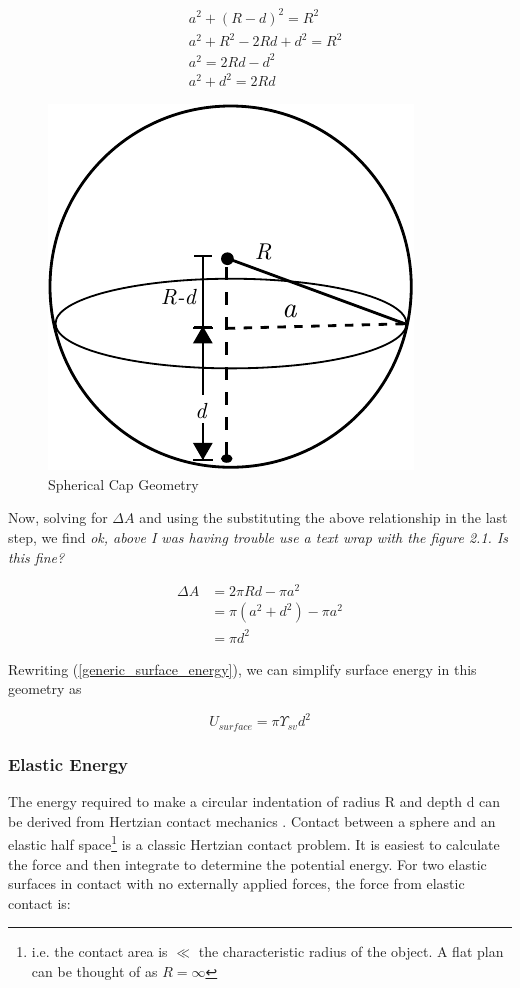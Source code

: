 \begin{figure}
	\begin{minipage}{.5\textwidth}
	\begin{align*}
	&a^2 + (R-d)^2 = R^2 \\
	&a^2 + R^2 - 2Rd +d^2 = R^2 \\
	&a^2 = 2Rd -d^2 \\
	&a^2 + d^2 = 2Rd
	\end{align*}
	\end{minipage}%
	\begin{minipage}{.5\textwidth}
	\centering
	\includegraphics[width=.5\linewidth]{Chapters/Figures/SphericalCap}
	\caption{Spherical Cap Geometry}
	\label{fig:sphericalcap}
	\end{minipage}
\end{figure}


Now, solving for $ \Delta A $ and using the substituting the above relationship in the last step, we find \emph{ok, above I was having trouble use a text wrap with the figure 2.1. Is this fine?}

\begin{align*}
\Delta A &= 2\pi Rd - \pi a^2 \\
&= \pi(a^2+d^2) - \pi a^2 \\
&= \pi d^2
\end{align*}
 
 Rewriting (\ref{generic_surface_energy}), we can simplify surface energy in this geometry as 
 
 \begin{equation}
 \label{surface_energy}
 U_{surface} = \pi \Upsilon_{sv} d^2
 \end{equation}



\subsubsection{Elastic Energy}
The energy required to make a circular indentation of radius R and depth d can be derived from Hertzian contact mechanics \cite{hertz1882uber} \cite{style2013surface} \cite{cao2016nanoparticles}. Contact between a sphere and an elastic half space\footnote{i.e. the contact area is $ \ll $ the characteristic radius of the object. A flat plan can be thought of as $ R = \infty $}   is a classic Hertzian contact problem. It is easiest to calculate the force and then integrate to determine the potential energy. For two elastic surfaces in contact with no externally applied forces, the force from elastic contact is:

